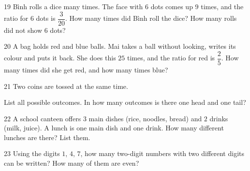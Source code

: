\gap
\begin{probbox}{19}{\relax}
Bình rolls a dice many times. The face with $6$ dots comes up $9$ times, and the ratio for $6$ dots is $\dfrac{3}{20}$. How many times did Bình roll the dice? How many rolls did not show $6$ dots?
\end{probbox}
\gap
\begin{probbox}{20}{\relax}
A bag holds red and blue balls. Mai takes a ball without looking, writes its colour and puts it back. She does this $25$ times, and the ratio for red is $\dfrac25$. How many times did she get red, and how many times blue?
\end{probbox}
\gap
\begin{probbox}{21}{\relax}
Two coins are tossed at the same time.\par
{} List all possible outcomes. \quad {} In how many outcomes is there one head and one tail?
\end{probbox}
\gap
\begin{probbox}{22}{\relax}
A school canteen offers $3$ main dishes (rice, noodles, bread) and $2$ drinks (milk, juice). A lunch is one main dish and one drink. How many different lunches are there? List them.
\end{probbox}
\gap
\begin{probbox}{23}{\relax}
Using the digits $1$, $4$, $7$, how many two-digit numbers with two different digits can be written? How many of them are even?
\end{probbox}
